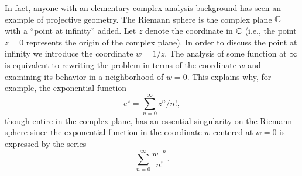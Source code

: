 In fact, anyone with an elementary complex analysis background has seen an
example of projective geometry. The Riemann sphere is the complex plane $\operatorname{\mathbb{C}}$
with a ``point at infinity'' added. Let $z$ denote the coordinate in $\operatorname{\mathbb{C}}$
(i.e., the point $z=0$ represents the origin of the complex plane). In order to
discuss the point at infinity we introduce the coordinate $w = 1/z$. The
analysis of some function at $\infty$ is equivalent to rewriting the problem in
terms of the coordinate $w$ and examining its behavior in a neighborhood of
$w=0$. This explains why, for example, the exponential function
\[
  e^z = \sum_{n=0}^\infty z^n / n!,
\]
though entire in the complex plane, has an essential singularity on the Riemann
sphere since the exponential function in the coordinate $w$ centered at $w=0$ is
expressed by the series
\[
  \sum_{n=0}^\infty \frac{w^{-n}}{n!}.
\]


